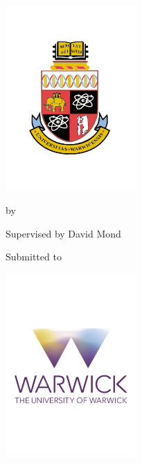 \begin{titlepage}
\begin{center}
\includegraphics[width=5cm]{Warwick_Crest} 

\vspace*{20pt}
\begin{spacing}{2}
\begin{center}
{\Large \bf \TheTitle} %

\vspace*{14pt}

by

{\Large \bf \TheAuthor} %

\vspace*{16pt}

{\large \bf \TheModule} %

Supervised by David Mond

Submitted to \TheUni %

{\Large \bf \TheDept} %

\TheSubDate %

\vspace*{36pt}
\includegraphics[width=5cm]{warwick_logo} 

\end{center}
\end{spacing}
\end{center}
\end{titlepage}
